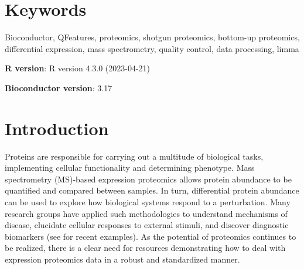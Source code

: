 \documentclass[9pt,a4paper,]{extarticle}
\begin{document}
\section*{Keywords}
Bioconductor, QFeatures, proteomics, shotgun proteomics, bottom-up proteomics,
differential expression, mass spectrometry, quality control, data processing,
limma


\clearpage
\pagestyle{main}

\textbf{R version}: R version 4.3.0 (2023-04-21)

\textbf{Bioconductor version}: 3.17

\hypertarget{introduction}{%
\section{Introduction}\label{introduction}}

Proteins are responsible for carrying out a multitude of biological tasks,
implementing cellular functionality and determining phenotype. Mass spectrometry
(MS)-based expression proteomics allows protein abundance to be quantified and
compared between samples. In turn, differential protein abundance can be used to
explore how biological systems respond to a perturbation. Many research groups
have applied such methodologies to understand mechanisms of disease, elucidate
cellular responses to external stimuli, and discover diagnostic biomarkers (see
\citep{PinaJimnez2021, AmiriDashatan2021, Anitua2018} for recent examples). As the
potential of proteomics continues to be realized, there is a clear need for
resources demonstrating how to deal with expression proteomics data in a robust
and standardized manner.
\end{document}
